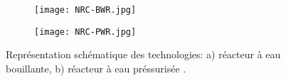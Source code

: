 \begin{refsection}
    
    \begin{figure}[H] 
 		\centering 
 		\begin{subfigure}[b]{0.65\textwidth}
 		    \texttt{[image: NRC-BWR.jpg]}
 		    \caption{}
 		    \label{subfig:BWR}
 		\end{subfigure}
 		
		\begin{subfigure}[b]{0.65\textwidth}
 		    \texttt{[image: NRC-PWR.jpg]}
 		    \caption{}
 		    \label{subfig:PWR}
 		\end{subfigure}
		\caption[Représentation schématique des technologies:
        a) réacteur à eau bouillante,
        b) réacteur à eau préssurisée.]
        {Représentation schématique des technologies:
        a) réacteur à eau bouillante,
        b) réacteur à eau préssurisée \citep{USNRC2013}.} 
 		\label{fig:Assembly_Control_Blades} 
 	\end{figure}
     \newpage


    


\end{refsection}
